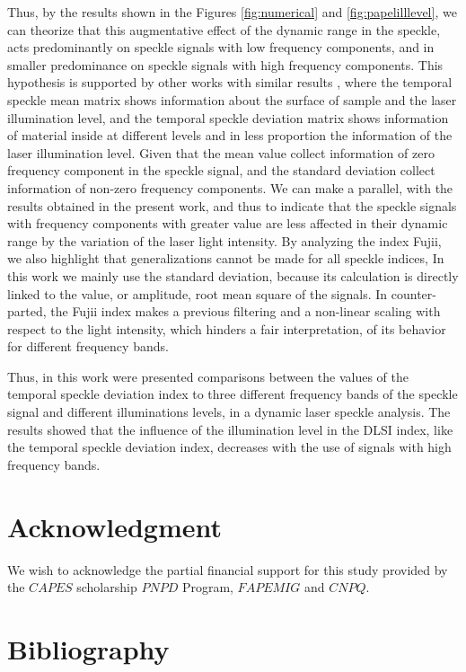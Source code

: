 \documentclass[review]{elsarticle}
\begin{document}
Thus, by the results shown in the Figures \ref{fig:numerical} and \ref{fig:papelilllevel},
we can theorize that this augmentative effect of the dynamic range in the speckle, acts predominantly on speckle signals with low frequency components, and in smaller predominance on speckle signals with high frequency components. 
This hypothesis is supported by other works with similar results \cite{Nothdurft:05},
where the temporal speckle mean matrix shows information about the surface of sample and the laser illumination level, and the temporal speckle deviation matrix shows information of material inside at different levels and in less proportion the information of the laser illumination level.
Given that the mean value collect information of zero frequency component in the speckle signal, 
and the standard deviation  collect information of non-zero frequency components.
We can make a parallel, with the results obtained in the present work,
and thus  to indicate that the speckle signals with frequency components with greater value are less affected in their dynamic range by the variation of the laser light intensity.
By analyzing the index Fujii, we also highlight that generalizations cannot be made for all speckle indices,
In this work we mainly use the standard deviation, because its calculation is directly linked to the value, or amplitude, root mean square of the signals.
In counter-parted, the Fujii index makes a previous filtering and a non-linear scaling with respect to the light intensity, which hinders a fair interpretation, of its behavior for different frequency bands.


Thus, in this work were presented comparisons between the values of the temporal speckle 
deviation index to three different frequency bands of the speckle signal and
different illuminations levels, in a
dynamic laser speckle analysis. The results showed that the influence of the illumination level in
the DLSI index, like the temporal speckle deviation 
index, decreases with the use of signals with high frequency bands.


\section{Acknowledgment}
We wish to acknowledge the partial financial support for this study provided by the $CAPES$ 
scholarship
$PNPD$ Program, $FAPEMIG$ and $CNPQ$.

\section{Bibliography}


\end{document}
